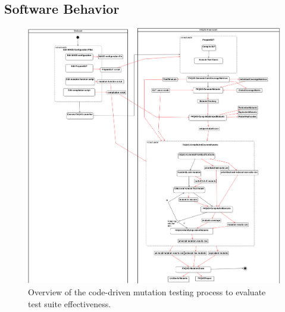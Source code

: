 \clearpage


\subsection{Software Behavior}



\begin{figure}[h]
  \centering
	\includegraphics[width=\textwidth]{images/CodeDrivenTestSuiteEvaluation.png}
      \caption{Overview of the code-driven mutation testing process to evaluate test suite effectiveness.}
      \label{fig:process:codeDriven:evaluation}
\end{figure}


